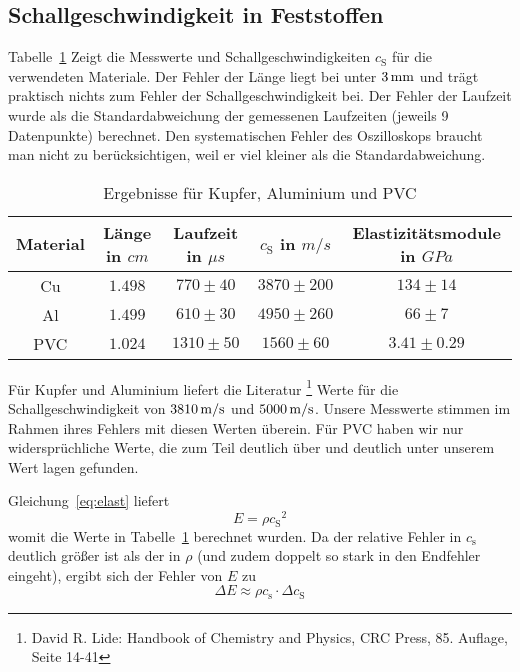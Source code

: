 \subsection{Schallgeschwindigkeit in Feststoffen}
Tabelle~\ref{tb:res} Zeigt die Messwerte und Schallgeschwindigkeiten $c_\mathrm{S}$ für die verwendeten Materiale. Der Fehler der Länge liegt bei unter $\unit[3]{mm}$ und trägt praktisch nichts zum Fehler der Schallgeschwindigkeit bei. 
Der Fehler der Laufzeit wurde als die Standardabweichung der gemessenen Laufzeiten (jeweils 9 Datenpunkte) berechnet. Den systematischen Fehler des Oszilloskops braucht man nicht zu berücksichtigen, weil er viel kleiner als die Standardabweichung.

\begin{table}
    \centering
\begin{tabular}[h]{c c c c c }
    Material & Länge in $\unit{cm}$ & Laufzeit in $\unit{\mu s}$ & $c_\mathrm{S}$ in $\unit{m/s}$ & Elastizitätsmodule in $\unit{GPa}$\\\hline
    Cu & $1.498$ & $770 \pm 40$ & $3870 \pm 200$ & $134 \pm 14$\\
    Al & $1.499$ & $610 \pm 30$ & $4950 \pm 260$ & $66 \pm 7$\\
    PVC & $1.024$ & $1310 \pm 50$ & $1560 \pm 60$ & $3.41 \pm 0.29$\\
\end{tabular}
\caption{Ergebnisse für Kupfer, Aluminium und PVC}
\label{tb:res}
\end{table}

Für Kupfer und Aluminium liefert die Literatur%
\footnote{David R. Lide: Handbook of Chemistry and Physics, CRC Press, 85. Auflage, Seite 14-41}
Werte für die Schallgeschwindigkeit von $\unit[3810]{m/s}$ und $\unit[5000]{m/s}$. Unsere Messwerte stimmen im Rahmen ihres  Fehlers mit diesen Werten überein. Für PVC haben wir nur widersprüchliche Werte, die zum Teil deutlich über und deutlich unter unserem Wert lagen gefunden.

Gleichung~\ref{eq:elast} liefert
%
\begin{equation*}
    E = \rho {c_\mathrm{S}}^2
\end{equation*}
%
womit die Werte in Tabelle~\ref{tb:res} berechnet wurden. Da der relative Fehler in $c_\mathrm{s}$ deutlich größer ist als der in $\rho$ (und zudem doppelt so stark in den Endfehler eingeht), ergibt sich der Fehler von $E$ zu
\[
    \Delta E \approx \rho c_\mathrm{s} \cdot \Delta c_\mathrm{S}
\]

